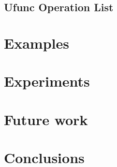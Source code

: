 \documentclass[preprint]{../PGAS10/sigplanconf}
\begin{document}


\subsection{Ufunc Operation List}




\section{Examples}


\section{Experiments}


\section{Future work}


\section{Conclusions}




\end{document}
